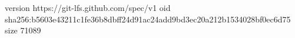 version https://git-lfs.github.com/spec/v1
oid sha256:b5603e43211c1fe36b8dbff24d91ac24add9bd3ec20a212b1534028bf0ec6d75
size 71089
